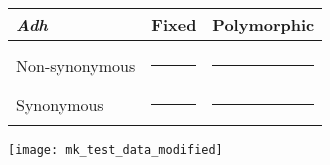 \documentclass[12pt, addpoints, hidelinks]{exam}
\begin{document}
\bigskip

\begin{tabular}{@{}lrr@{}}
\toprule
\textit{Adh} & Fixed & Polymorphic \\
\midrule
&&\\[1em]
Non-synonymous	&	\rule{0.5in}{0.4pt} &	\rule{0.5in}{0.4pt}  	\\[2em]
Synonymous		&	\rule{0.5in}{0.4pt} &	\rule{0.5in}{0.4pt} \\
\bottomrule
\end{tabular}


\newpage

\begin{center}
\texttt{[image: mk\_test\_data\_modified]}\label{mk_data}
\end{center}
\end{document}
